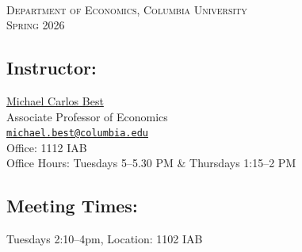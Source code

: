 \documentclass[11pt]{article}
\begin{document}


 \\
\textsc{Department of Economics, Columbia University} \\
\textsc{Spring 2026}

\subsection*{Instructor:}
\href{http://www.columbia.edu/~mcb2270/}{Michael Carlos Best} \\
Associate Professor of Economics \\
\href{mailto:michael.best@columbia.edu}{\nolinkurl{michael.best@columbia.edu}} \\
Office: 1112 IAB \\
Office Hours: Tuesdays 5--5.30 PM \& Thursdays 1:15--2 PM

\subsection*{Meeting Times:}
Tuesdays 2:10--4pm, Location: 1102 IAB
\end{document}
